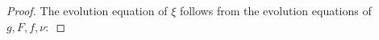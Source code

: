 \documentclass{amsart}
\newtheorem{lemma}[theorem]{Lemma}
\theoremstyle{definition}
\theoremstyle{remark}
\numberwithin{equation}{section}
\begin{document}
\begin{proof}
The evolution equation of $\xi$ follows from the evolution equations of $g, F,  f ,\nu:$ 




\end{proof}
\end{document}
